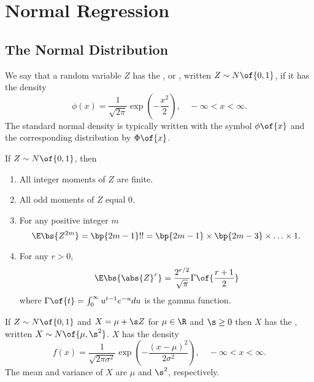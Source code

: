 
\setcounter{chapter}{4}
\chapter{Normal Regression}


\setcounter{section}{1}
\section{The Normal Distribution}

We say that a random variable $Z$ has the , or , written $Z \sim N\of{0,1}$, if it has the density 
$$\phi(x)=\frac{1}{\sqrt{2 \pi}} \exp \left(-\frac{x^2}{2}\right), \quad -\infty < x < \infty .$$
The standard normal density is typically written with the symbol $\phi\of{x}$ and the corresponding distribution by $\Phi\of{x}$.

\begin{theorem} 
    \label{Hansen_thm_5_1}
    If $Z \sim N\of{0,1}$, then 
    \begin{enumerate}[topsep=10pt, leftmargin=20pt, itemsep=0pt, label=(\arabic*)]
        \setlength{\parskip}{10pt} 
        \item All integer moments of $Z$ are finite.
        \item All odd moments of $Z$ equal 0.
        \item For any positive integer $m$ 
        \begin{equation}
            \notag
            \E\bs{Z^{2m}} = \bp{2m-1}!! = \bp{2m-1} \times \bp{2m-3} \times \ldots \times 1.
        \end{equation}
        \item For any $r>0$,
        \begin{equation}
            \notag
            \E\bs{\abs{Z}^r} = \frac{2^{r/2}}{\sqrt{\pi}} \Gamma\of{\frac{r+1}{2}}
        \end{equation}
        where $\Gamma\of{t} = \int_0^\infty u^{t-1} e^{-u} du$ is the gamma function.
    \end{enumerate}
\end{theorem}

If $Z \sim N\of{0,1}$ and $X = \mu + \s Z$ for $\mu \in \R$ and $\s \geq 0$ then $X$ has the , written $X \sim N\of{\mu, \s^2}$. $X$ has the density 
$$f(x)=\frac{1}{\sqrt{2 \pi \sigma^2}} \exp \left(-\frac{(x-\mu)^2}{2 \sigma^2}\right), \quad-\infty<x<\infty.$$
The mean and variance of $X$ are $\mu$ and $\s^2$, respectively.

